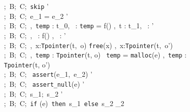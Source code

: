 \begin{figure}[H]
\small
\infrule[Sskip]{
}
{
\Theta;\ B;\ C;\ \Gamma \vdash \texttt{skip} \Rightarrow \Gamma'
}
~\\[-5pt]
{
\Theta;\ B;\ C;\ \Gamma \vdash e_{1} = e_{2} \Rightarrow
\Gamma'
}
~\\[-5pt]
{
\Theta;\ B;\ C;\ \Gamma,\ \texttt{temp} : t_{0},\  : \tilde{\tau} \vdash
\texttt{temp} = f() \Rightarrow
\Gamma,\ t : t_{1},\  : \tilde{\tau}'
}
~\\[-5pt]
{
\Theta;\ B;\ C;\ \Gamma,\  :  \vdash f() \Rightarrow
\Gamma,\  : '
}
~\\[-5pt]
{
\Theta;\ B;\ C;\ \Gamma,\ x:\texttt{Tpointer}(t,\ o) \vdash \texttt{free}(x)
\Rightarrow \Gamma,\ x:\texttt{Tpointer}(t,\ o')
}
~\\[-5pt]
{
\Theta;\ B;\ C;\ \Gamma,\ \texttt{temp} : \texttt{Tpointer}(t, o)\ \vdash
\texttt{temp} = \texttt{malloc}(e) \Rightarrow
\Gamma,\ \texttt{temp} : \texttt{Tpointer}(t, o')
}
~\\[-5pt]
{
\Theta;\ B;\ C;\ \Gamma \vdash
\texttt{assert}(e_{1},\ e_{2})
\Rightarrow \Gamma'
}
~\\[-5pt]
{
\Theta;\ B;\ C;\ \Gamma \vdash
\texttt{assert\_null}(e)
\Rightarrow \Gamma'
}
~\\[-5pt]
{
\Theta;\ B;\ C;\ \Gamma \vdash s_{1};\ s_{2} \Rightarrow \Gamma'
}
~\\[-5pt]
{
\Theta;\ B;\ C;\ \Gamma \vdash \texttt{if} (e)\ \texttt{then}\ s_1\ \texttt{else}\ s_2
\Rightarrow \Gamma_2
}
~\\[-5pt]
\end{figure}

